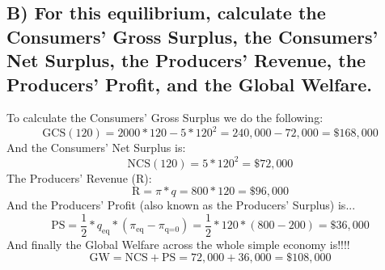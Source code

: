 \documentclass{article}
\begin{document}
\subsection{B) For this equilibrium, calculate the Consumers' Gross Surplus, the Consumers' Net Surplus, the Producers' Revenue, the Producers' Profit, and the Global Welfare.}
To calculate the Consumers' Gross Surplus we do the following:
$$ \text{GCS}(120) = 2000*120 - 5*120^2 = 240,000 - 72,000 = \$168,000 $$
And the Consumers' Net Surplus is:
$$ \text{NCS}(120) = 5*120^2 = \$72,000 $$
The Producers' Revenue (R):
$$ \text{R}  = \pi*q=800*120=\$96,000 $$
And the Producers' Profit (also known as the Producers' Surplus) is...
$$ \text{PS} = \frac{1}{2}*q_{\text{eq}}*(\pi_{\text{eq}}-\pi_{\text{q=0}}) = \frac{1}{2}*120*(800-200) = \$36,000 $$
And finally the Global Welfare across the whole simple economy is!!!!
$$ \text{GW} = \text{NCS} + \text{PS} = 72,000 + 36,000 = \$108,000 $$
\end{document}
